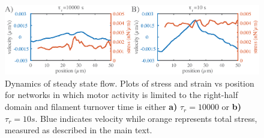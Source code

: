 \begin{figure}[h!]
	\centering
	\includegraphics[width=\hsize]{active/figures/FigS6}
	\caption{\label{fig:combo_prof}  Dynamics of steady state flow. Plots of stress and strain vs position for networks in which motor activity is limited to the right-half domain and filament turnover time is either  \textbf{a)} $\tau_r = 10000$ or  \textbf{b)} $\tau_r = 10 s$.  Blue indicates velocity while orange represents total stress, measured as described in the main text. }
\end{figure}